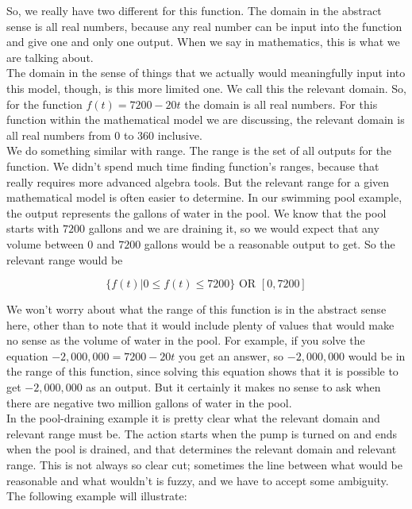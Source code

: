 So, we really have two different  for this function. The domain in the abstract sense is all real numbers, because any real number can be input into the function and give one and only one output. When we say  in mathematics, this is what we are talking about.\\

The domain in the sense of things that we actually would meaningfully input into this model, though, is this more limited one. We call this the relevant domain. So, for the function $f(t)=7200-20t$ the domain is all real numbers. For this function within the mathematical model we are discussing, the relevant domain is all real numbers from $0$ to $360$ inclusive.\\

We do something similar with range. The range is the set of all outputs for the function. We didn’t spend much time finding function’s ranges, because that really requires more advanced algebra tools. But the relevant range for a given mathematical model is often easier to determine. In our swimming pool example, the output represents the gallons of water in the pool. We know that the pool starts with $7200$ gallons and we are draining it, so we would expect that any volume between $0$ and $7200$ gallons would be a reasonable output to get. So the relevant range would be

\begin{equation*}
	\{f(t)|0 \leq f(t) \leq 7200\} \text{    OR    } [0,7200]
\end{equation*}

We won’t worry about what the range of this function is in the abstract sense here, other than to note that it would include plenty of values that would make no sense as the volume of water in the pool. For example, if you solve the equation $-2,000,000=7200-20t$ you get an answer, so $-2,000,000$ would be in the range of this function, since solving this equation shows that it is possible to get $-2,000,000$ as an output. But it certainly it makes no sense to ask when there are
negative two million gallons of water in the pool.\\

In the pool-draining example it is pretty clear what the relevant domain and relevant range must be.  The action starts when the pump is turned on and ends when the pool is drained, and that determines the relevant domain and relevant range. This is not always so clear cut; sometimes the line between what would be reasonable and what wouldn’t is fuzzy, and we have to accept some ambiguity. The following example will illustrate:

